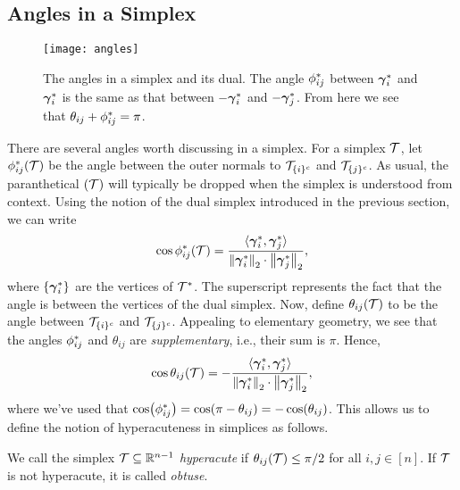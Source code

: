 \subsection{Angles in a Simplex}
\label{sec:background_simplex_angles}

\begin{figure}
	\centering
	\texttt{[image: angles]}
	\caption{The angles in a simplex and its dual. The angle $\phi^*_{ij}$ between $\vb*{\gamma}^*_i$ and $\vb*{\gamma}^*_i$ is the same as that between $-\vb*{\gamma}_i^*$ and $-\vb*{\gamma}_j^*$. From here  we  see that $\theta_{ij}+\phi^*_{ij}=\pi$.}
\end{figure}
There are several angles worth discussing in a simplex. For a simplex $\mathcal{T}$, let $\phi^*_{ij}(\mathcal{T})$ be the angle between the outer normals to $\mathcal{T}_{\{i\}^c}$ and $\mathcal{T}_{\{j\}^c}$. As usual, the paranthetical $(\mathcal{T})$ will typically be dropped when the simplex is understood from context. Using the notion of the dual simplex introduced in the previous section, we can write 
 \begin{equation*}
\cos \phi^*_{ij}(\mathcal{T}) = \frac{\langle \vb*{\gamma}^*_i,\vb*{\gamma}^*_j\rangle }{\norm{\vb*{\gamma}^*_i}_2 \cdot \norm{\vb*{\gamma}^*_j}_2},
\end{equation*}
where $\{\vb*{\gamma}^*_i\}$ are the vertices of $\mathcal{T}^*$. The superscript represents  the fact that the angle is between the  vertices of the dual simplex. 
Now, define $\theta_{ij}(\mathcal{T})$ to be the angle between $\mathcal{T}_{\{i\}^c}$ and $\mathcal{T}_{\{j\}^c}$. Appealing to elementary geometry, we see that the angles $\phi^*_{ij}$ and $\theta_{ij}$ are \emph{supplementary}, i.e., their sum is $\pi$. Hence, 
\begin{equation}
\label{eq:cos_theta_ij}
\cos \theta_{ij}(\mathcal{T}) = - \frac{\langle \vb*{\gamma}^*_i,\vb*{\gamma}^*_j\rangle }{\norm{\vb*{\gamma}^*_i}_2 \cdot \norm{\vb*{\gamma}^*_j}_2},
\end{equation}
where we've used that $\cos(\phi^*_{ij}) = \cos(\pi - \theta_{ij}) = -\cos(\theta_{ij})$. This allows us to define the notion of  hyperacuteness in simplices as follows. 

\begin{definition}
	\label{def:hyperacute}
	We call the simplex $\mathcal{T}\subseteq \mathbb{R}^{n-1}$ \emph{hyperacute} if $\theta_{ij}(\mathcal{T})\leq \pi/2$ for all $i,j\in[n]$. If $\mathcal{T}$ is not hyperacute, it is called \emph{obtuse}. 
\end{definition}


